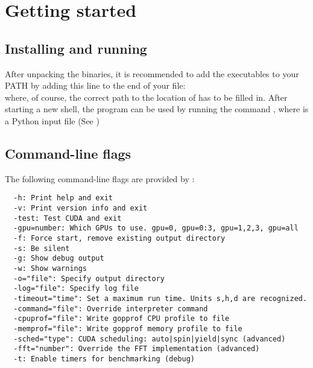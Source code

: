 \section{Getting started}

\subsection{Installing and running \mumax}

After unpacking the \mumax binaries, it is recommended to add the \mumax executables to your PATH by adding this line to the end of your  file:\\
 where, of course, the correct path to the location of \mumax has to be filled in.  After starting a new shell, the program can be used by running the command , where  is a Python input file (See )

\subsection{Command-line flags}

The following command-line flags are provided by \mumax:
\begin{verbatim}
  -h: Print help and exit
  -v: Print version info and exit
  -test: Test CUDA and exit
  -gpu=number: Which GPUs to use. gpu=0, gpu=0:3, gpu=1,2,3, gpu=all
  -f: Force start, remove existing output directory
  -s: Be silent
  -g: Show debug output
  -w: Show warnings
  -o="file": Specify output directory
  -log="file": Specify log file
  -timeout="time": Set a maximum run time. Units s,h,d are recognized.
  -command="file": Override interpreter command
  -cpuprof="file": Write gopprof CPU profile to file
  -memprof="file": Write gopprof memory profile to file
  -sched="type": CUDA scheduling: auto|spin|yield|sync (advanced)
  -fft="number": Override the FFT implementation (advanced)
  -t: Enable timers for benchmarking (debug)
\end{verbatim}



